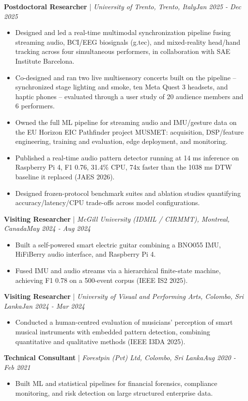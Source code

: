 \documentclass[11pt]{article}
\newenvironment{cvrole}[5]{%
  \par\noindent\textbf{\large #1} | \textit{\small #2, #3}\hfill \textit{\small #4 - #5}\par
  \begin{itemize}[leftmargin=2em, itemsep=-0.3em, topsep=-0.5em]%
}{%
  \end{itemize}\par\noindent\mbox{}\par\vspace{0.1em}%
}
\begin{document}
\begin{cvrole}{Postdoctoral Researcher}{University of Trento}{Trento, Italy}{Jan 2025}{Dec 2025}
  \item Designed and led a real-time multimodal synchronization pipeline fusing streaming audio, BCI/EEG biosignals (g.tec), and mixed-reality head/hand tracking across four simultaneous performers, in collaboration with SAE Institute Barcelona.
  \item Co-designed and ran two live multisensory concerts built on the pipeline -- synchronized stage lighting and smoke, ten Meta Quest 3 headsets, and haptic phones -- evaluated through a user study of 20 audience members and 6 performers.
  \item Owned the full ML pipeline for streaming audio and IMU/gesture data on the EU Horizon EIC Pathfinder project MUSMET: acquisition, DSP/feature engineering, training and evaluation, edge deployment, and monitoring.
  \item Published a real-time audio pattern detector running at 14 ms inference on Raspberry Pi 4, F1 0.76, 31.4\% CPU, 74x faster than the 1038 ms DTW baseline it replaced (JAES 2026).
  \item Designed frozen-protocol benchmark suites and ablation studies quantifying accuracy/latency/CPU trade-offs across model configurations.
\end{cvrole}

\begin{cvrole}{Visiting Researcher}{McGill University (IDMIL / CIRMMT)}{Montreal, Canada}{May 2024}{Aug 2024}
  \item Built a self-powered smart electric guitar combining a BNO055 IMU, HiFiBerry audio interface, and Raspberry Pi 4.
  \item Fused IMU and audio streams via a hierarchical finite-state machine, achieving F1 0.78 on a 500-event corpus (IEEE IS2 2025).
\end{cvrole}

\begin{cvrole}{Visiting Researcher}{University of Visual and Performing Arts}{Colombo, Sri Lanka}{Jan 2024}{Mar 2024}
  \item Conducted a human-centred evaluation of musicians' perception of smart musical instruments with embedded pattern detection, combining quantitative and qualitative methods (IEEE I3DA 2025).
\end{cvrole}

\begin{cvrole}{Technical Consultant}{Forestpin (Pvt) Ltd}{Colombo, Sri Lanka}{Aug 2020}{Feb 2021}
  \item Built ML and statistical pipelines for financial forensics, compliance monitoring, and risk detection on large structured enterprise data.
\end{cvrole}
\end{document}
